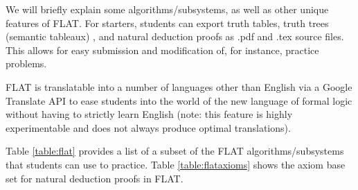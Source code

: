 \documentclass[ms]{uncgdissertationexp2}
\theoremstyle{plain}
\theoremstyle{definition}
\theoremstyle{remark}
\begin{document}
We will briefly explain some algorithms/subsystems, as well as other unique features of FLAT. For starters, students can export truth tables, truth trees (semantic tableaux) \cite{priest2008}, and natural deduction proofs as .pdf and .tex source files. This allows for easy submission and modification of, for instance, practice problems.

FLAT is translatable into a number of languages other than English via a Google Translate API to ease students into the world of the new language of formal logic without having to strictly learn English (note: this feature is highly experimentable and does not always produce optimal translations). 

Table \ref{table:flat} provides a list of a subset of the FLAT algorithms/subsystems that students can use to practice. Table \ref{table:flataxioms} shows the axiom base set for natural deduction proofs in FLAT.
\end{document}
